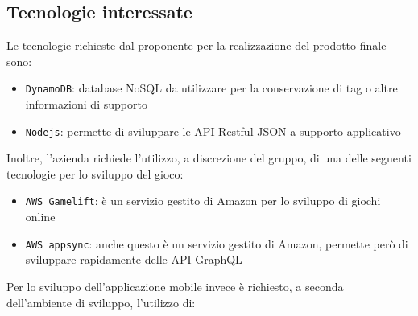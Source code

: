 \subsection{Tecnologie interessate}
Le tecnologie richieste dal proponente per la realizzazione del prodotto finale sono:
\begin{itemize}
	\item \verb|DynamoDB|: database NoSQL da utilizzare per la conservazione di tag o altre informazioni di supporto
	\item \verb|Nodejs|: permette di sviluppare le API Restful JSON a supporto applicativo
\end{itemize}
Inoltre, l'azienda richiede l'utilizzo, a discrezione del gruppo, di una delle seguenti tecnologie per lo sviluppo del gioco:
\begin{itemize}
	\item \verb|AWS Gamelift|: è un servizio gestito di Amazon per lo sviluppo di giochi online
	\item \verb|AWS appsync|: anche questo è un servizio gestito di Amazon, permette però di sviluppare rapidamente delle API GraphQL
\end{itemize}
Per lo sviluppo dell'applicazione mobile invece è richiesto, a seconda dell'ambiente di sviluppo, l'utilizzo di: